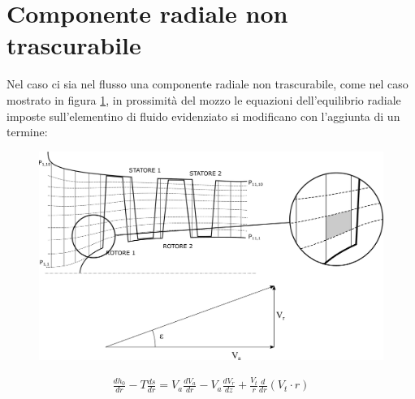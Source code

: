\section{Componente radiale non trascurabile}
Nel caso ci sia nel flusso una componente radiale non trascurabile, come nel caso mostrato in figura \ref{fd:comp_rad}, in prossimità del mozzo le equazioni dell'equilibrio radiale imposte sull'elementino di fluido evidenziato si modificano con l'aggiunta di un termine:
\begin{figure}
\centering
  \includegraphics[width=.8\textwidth]{fig/comp_rad.pdf}
\caption{}
\label{fd:comp_rad}
\end{figure}
\begin{align*}
\frac{d h_0}{dr} - T\frac{ds}{dr} = V_a \frac{dV_a}{dr} - \boxed{V_a \frac{dV_r}{dz}} + \frac{V_t}{r} \frac{d}{dr} ( V_t \cdot r)
\end{align*}
